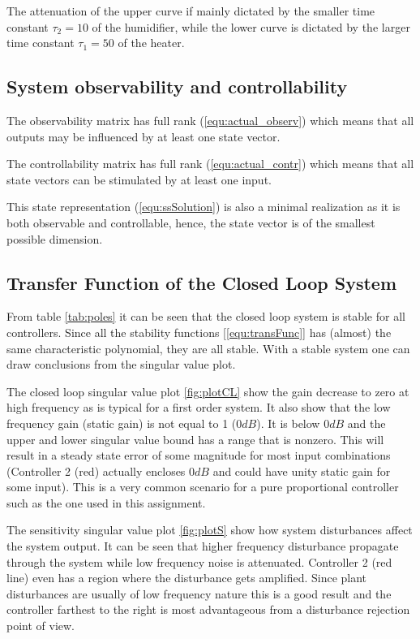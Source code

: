 \documentclass[a4paper, titlepage]{article}
\begin{document}
The attenuation of the upper curve if mainly dictated by the smaller time constant $\tau_{2}=10$ of the humidifier, while the lower curve is dictated by the larger time constant $\tau_{1}=50$ of the heater. 

\subsection{System observability and controllability}

The observability matrix has full rank (\ref{equ:actual_observ}) which means that all outputs may be influenced by at least one state vector.

The controllability matrix has full rank (\ref{equ:actual_contr}) which means that all state vectors can be stimulated by at least one input.

This state representation (\ref{equ:ssSolution}) is also a minimal realization as it is both observable and controllable, hence, the state vector is of the smallest possible dimension.

\subsection{Transfer Function of the Closed Loop System}
From table \ref{tab:poles} it can be seen that the closed loop system is stable for all controllers. 
Since all the stability functions [\ref{equ:transFunc}] has (almost) the same characteristic polynomial, they are all stable.
With a stable system one can draw conclusions from the singular value plot.

The closed loop singular value plot \ref{fig:plotCL} show the gain decrease to zero at high frequency as is typical for a first order system.
It also show that the low frequency gain (static gain) is not equal to 1 ($0dB$).
It is below $0dB$ and the upper and lower singular value bound has a range that is nonzero.
This will result in a steady state error of some magnitude for most input combinations (Controller 2 (red) actually encloses $0dB$ and could have unity static gain for some input).
This is a very common scenario for a pure proportional controller such as the one used in this assignment.

The sensitivity singular value plot \ref{fig:plotS} show how system disturbances affect the system output.
It can be seen that higher frequency disturbance propagate through the system while low frequency noise is attenuated.
Controller 2 (red line) even has a region where the disturbance gets amplified.
Since plant disturbances are usually of low frequency nature this is a good result and the controller farthest to the right is most advantageous from a disturbance rejection point of view.
\end{document}
